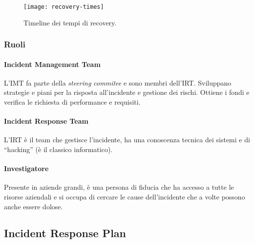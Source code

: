 \begin{figure}
        \begin{center}
                \texttt{[image: recovery-times]}
        \end{center}
        \caption{Timeline dei tempi di recovery.}
        \label{fig:recovery:timeline}
\end{figure}

\subsubsection{Ruoli}

\paragraph*{Incident Management Team} L'IMT fa parte della \textit{steering
commitee} e sono membri dell'IRT. Sviluppano strategie e piani per la risposta
all'incidente e gestione dei rischi. Ottiene i fondi e verifica le richiesta
di performance e requisiti.

\paragraph*{Incident Response Team} L'IRT è il
team che gestisce l'incidente, ha una conoscenza tecnica dei sistemi e di
``hacking'' (è il classico informatico).

\paragraph*{Investigatore} Presente in aziende grandi, è una persona di fiducia
che ha accesso a tutte le risorse aziendali e si occupa di cercare le cause
dell'incidente che a volte possono anche essere dolose.



\subsection{Incident Response Plan}

